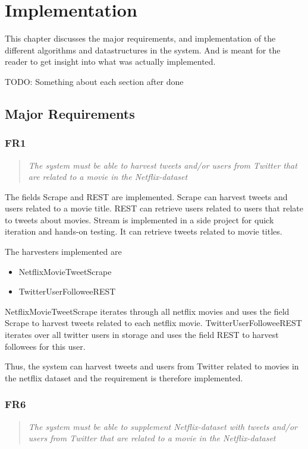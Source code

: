 
\chapter{Implementation}

\minitoc

This chapter discusses the major requirements, and implementation of the different algorithms and datastructures in the system. And is meant for the reader to get insight into what was actually implemented.

TODO: Something about each section after done
\clearpage

\section{Major Requirements}\label{impl:Major Requirements}
\subsection{FR1}
\begin{quotation}
\em The system must be able to harvest tweets and/or users from Twitter that are related to a movie in the Netflix-dataset %
\end{quotation}

The fields Scrape and REST are implemented. Scrape can harvest tweets and users related to a movie title. REST can retrieve users related to users that relate to tweets about movies. Stream is implemented in a side project for quick iteration and hands-on testing. It can retrieve tweets related to movie titles.

The harvesters implemented are
\begin{itemize}
\item NetflixMovieTweetScrape
\item TwitterUserFolloweeREST
\end{itemize}

NetflixMovieTweetScrape iterates through all netflix movies and uses the field Scrape to harvest tweets related to each netflix movie. TwitterUserFolloweeREST iterates over all twitter users in storage and uses the field REST to harvest followees for this user.

Thus, the system can harvest tweets and users from Twitter related to movies in the netflix dataset and the requirement is therefore implemented.

\subsection{FR6}
\begin{quotation}
\em The system must be able to supplement Netflix-dataset with tweets and/or users from Twitter that are related to a movie in the Netflix-dataset %
\end{quotation}

